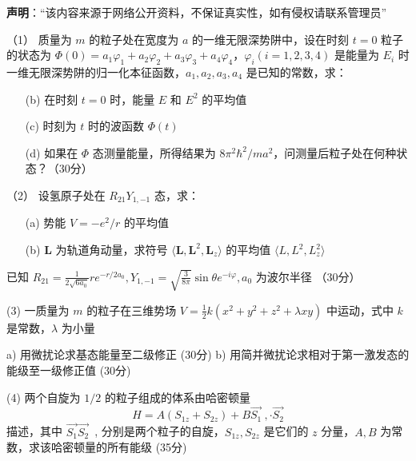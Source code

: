 
\textbf{声明}：“该内容来源于网络公开资料，不保证真实性，如有侵权请联系管理员”


（1） 质量为 $m$ 的粒子处在宽度为 $a$ 的一维无限深势阱中，设在时刻 $t=0$ 粒子的状态为 $\Phi(0) = a_1 \varphi_1 + a_2 \varphi_2 + a_3 \varphi_3 + a_4 \varphi_4$，$\varphi_i (i=1,2,3,4)$ 是能量为 $E_i$ 时一维无限深势阱的归一化本征函数，$a_1, a_2, a_3, a_4$ 是已知的常数，求：

   \begin{enumerate}
    [(a)] 在时刻 $t=0$ 时，测量能量，结果小于 $3 \pi^2 \hbar^2 / ma^2$ 的几率
     \item [(b)] 在时刻 $t=0$ 时，能量 $E$ 和 $E^2$ 的平均值
     \item [(c)] 时刻为 $t$ 时的波函数 $\Phi(t)$
     \item [(d)] 如果在 $\Phi$ 态测量能量，所得结果为 $8 \pi^2 \hbar^2 / ma^2$，问测量后粒子处在何种状态？（30分）
    \end{enumerate}

   （2）  设氢原子处在 $R_{21} Y_{1,-1}$ 态，求：

    \begin{enumerate}
     \item [(a)] 势能 $V = -e^2 / r$ 的平均值
     \item [(b)]$\mathbf{L}$ 为轨道角动量，求符号 $\langle \mathbf{L}, \mathbf{L}^2, \mathbf{L}_z \rangle$ 的平均值 $\langle L, L^2, L_z^2 \rangle$
    \end{enumerate}


已知 $R_{21} = \frac{1}{2 \sqrt{6 a_0}} r e^{-r / 2a_0}, Y_{1,-1} = \sqrt{\frac{3}{8 \pi}} \sin \theta e^{-i \varphi}, a_0$ 为波尔半径 （30分）

   (3) 一质量为 $m$ 的粒子在三维势场 $V = \frac{1}{2} k (x^2 + y^2 + z^2 + \lambda xy)$ 中运动，式中 $k$ 是常数，$\lambda$ 为小量

a) 用微扰论求基态能量至二级修正 (30分) 
b) 用简并微扰论求相对于第一激发态的能级至一级修正值 (30分)

(4) 两个自旋为 $1/2$ 的粒子组成的体系由哈密顿量 
$$H = A (S_{1z} + S_{2z}) + B \vec{S_1}~, \cdot \vec{S_2}$$
描述，其中 $\vec{S_1} \vec{S_2}$~, 分别是两个粒子的自旋，$S_{1z}, S_{2z}$ 是它们的 $z$ 分量，$A, B$ 为常数，求该哈密顿量的所有能级  (35分)


